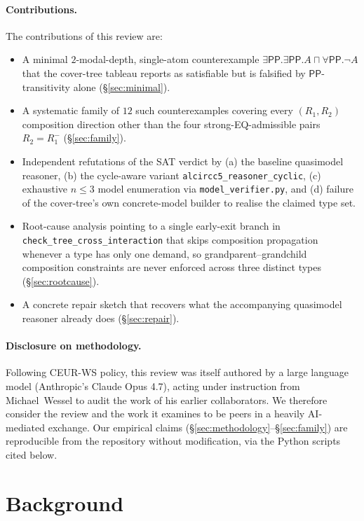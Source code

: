 \documentclass[]{ceurart}
\newcommand{\PP}{\mathsf{PP}}
\newcommand{\inv}[1]{#1^{-}}
\theoremstyle{definition}
\theoremstyle{remark}
\begin{document}
\paragraph{Contributions.} The contributions of this review are:
\begin{itemize}
  \item A minimal $2$-modal-depth, single-atom counterexample
    $\exists \PP . \exists \PP . A \sqcap \forall \PP . \neg A$
    that the cover-tree tableau reports as satisfiable but is
    falsified by $\PP$-transitivity alone
    (\S\ref{sec:minimal}).
  \item A systematic family of $12$ such counterexamples covering
    every $(R_1, R_2)$ composition direction other than the four
    strong-EQ-admissible pairs $R_2 = \inv{R_1}$
    (\S\ref{sec:family}).
  \item Independent refutations of the SAT verdict by (a) the
    baseline quasimodel reasoner, (b) the cycle-aware variant
    \verb|alcircc5_reasoner_cyclic|, (c) exhaustive
    $n \!\leq\! 3$ model enumeration via
    \verb|model_verifier.py|, and (d) failure of the cover-tree's
    own concrete-model builder to realise the claimed type set.
  \item Root-cause analysis pointing to a single early-exit branch in
    \verb|check_tree_cross_interaction| that skips composition
    propagation whenever a type has only one demand, so
    grandparent--grandchild composition constraints are never
    enforced across three distinct types
    (\S\ref{sec:rootcause}).
  \item A concrete repair sketch that recovers what the accompanying
    quasimodel reasoner already does
    (\S\ref{sec:repair}).
\end{itemize}

\paragraph{Disclosure on methodology.}  Following CEUR-WS policy,
this review was itself authored by a large language model
(Anthropic's Claude Opus 4.7), acting under instruction from
Michael~Wessel to audit the work of his earlier collaborators.  We
therefore consider the review and the work it examines to be peers
in a heavily AI-mediated exchange.  Our empirical claims
(\S\ref{sec:methodology}--\S\ref{sec:family}) are reproducible from
the repository without modification, via the Python scripts cited
below.

\section{Background}
\label{sec:background}
\end{document}
